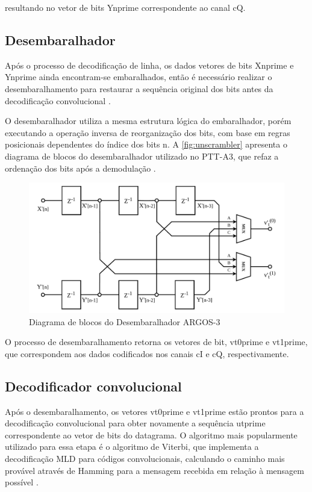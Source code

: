 \noindent resultando no vetor de bits \gls{Ynprime} correspondente ao canal \gls{cQ}. 

\subsection{Desembaralhador}

Após o processo de decodificação de linha, os dados vetores de bits \gls{Xnprime} e \gls{Ynprime} ainda encontram-se embaralhados, então é necessário realizar o desembaralhamento para restaurar a sequência original dos bits antes da decodificação convolucional \cite{cnes_services_and_message_formats_ed2_rev2_2006}.

O desembaralhador utiliza a mesma estrutura lógica do embaralhador, porém executando a operação inversa de reorganização dos bits, com base em regras posicionais dependentes do índice dos bits \gls{n}. A \autoref{fig:unscrambler} apresenta o diagrama de blocos do desembaralhador utilizado no \gls{PTT-A3}, que refaz a ordenação dos bits após a demodulação \cite{rodrigues_demodulador_2018}.

\begin{figure}[H]
\centering
\caption{Diagrama de blocos do Desembaralhador ARGOS-3}\label{fig:unscrambler}
\includegraphics[width=\linewidth]{assets/cap2/unscrambler.pdf}
\end{figure}

O processo de desembaralhamento retorna os vetores de bit, \gls{vt0prime} e \gls{vt1prime}, que correspondem aos dados codificados nos canais \gls{cI} e \gls{cQ}, respectivamente.

\subsection{Decodificador convolucional}

Após o desembaralhamento, os vetores \gls{vt0prime} e \gls{vt1prime} estão prontos para a decodificação convolucional para obter novamente a sequência \gls{utprime} correspondente ao vetor de bits do datagrama. O algoritmo mais popularmente utilizado para essa etapa é o algoritmo de Viterbi, que implementa a decodificação \gls{MLD} para códigos convolucionais, calculando o caminho mais provável através de \gls{Hamming} para a mensagem recebida em relação à mensagem possível \cite{cnes_services_and_message_formats_ed2_rev2_2006, rodrigues_demodulador_2018}.

